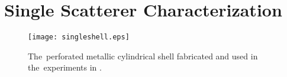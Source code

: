 


\section{Single Scatterer Characterization}

\begin{figure}
\begin{center}
\texttt{[image: singleshell.eps]}
\caption{The~perforated metallic cylindrical shell fabricated and used in the~experiments in \cite{garcia1, garcia2, garcia11}.}
\label{fig:singleshellChain}
\end{center}
\end{figure}

